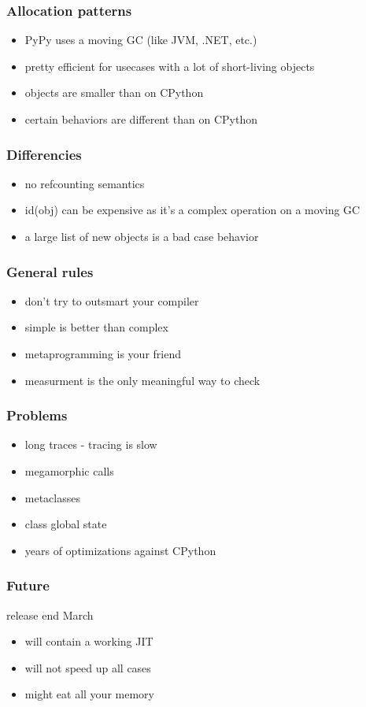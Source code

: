 \documentclass[utf8x, 14pt]{beamer}
\begin{document}
\begin{frame}
  \frametitle{Allocation patterns}
  \begin{itemize}
    \item PyPy uses a moving GC (like JVM, .NET, etc.)
    \item pretty efficient for usecases with a lot of
      short-living objects
    \item objects are smaller than on CPython
    \item certain behaviors are different than on CPython
  \end{itemize}
\end{frame}

\begin{frame}
  \frametitle{Differencies}
  \begin{itemize}
    \item no refcounting semantics
    \item {\ttfamily id(obj)} can be expensive as it's a complex
      operation on a moving GC
    \item a large list of new objects is a bad case behavior
  \end{itemize}
\end{frame}

\begin{frame}
  \frametitle{General rules}
  \begin{itemize}
    \item don't try to outsmart your compiler
    \item simple is better than complex
    \item metaprogramming is your friend
    \item measurment is the only meaningful way to check
  \end{itemize}
\end{frame}

\begin{frame}
  \frametitle{Problems}
  \begin{itemize}
    \item long traces - tracing is slow
    \item megamorphic calls
    \item metaclasses
    \item class global state
      \pause
    \item years of optimizations against CPython
  \end{itemize}
\end{frame}

\begin{frame}
  \frametitle{Future}
  \begin{block}{release end March}
    \begin{itemize}
      \item will contain a working JIT
      \item will not speed up all cases
      \item might eat all your memory
    \end{itemize}
  \end{block}
\end{frame}
\end{document}
